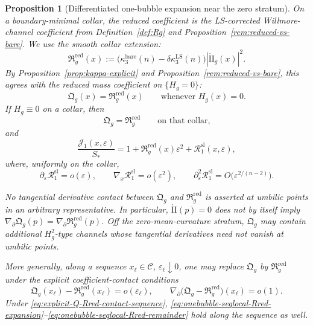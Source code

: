 \documentclass[11pt,reqno,a4paper]{amsart}
\numberwithin{equation}{section}
\theoremstyle{plain}
\newtheorem{proposition}[theorem]{Proposition}
\theoremstyle{remark}
\theoremstyle{plain}
\begin{document}
\begin{proposition}[Differentiated one-bubble expansion near the zero stratum]
On a boundary-minimal collar, the reduced coefficient is the LS-corrected Willmore-channel coefficient
from Definition~\ref{def:Rg} and Proposition~\ref{rem:reduced-vs-bare}.  We use the smooth collar
extension:
\begin{equation}\label{eq:Rred-Willmore-channel-extension}
\mathfrak R_g^{\mathrm{red}}(x)
:=
\bigl(\kappa_3^{\mathrm{bare}}(n)-\delta\kappa_3^{\mathrm{LS}}(n)\bigr)
|\mathring{\mathrm{II}}_g(x)|^2 .
\end{equation}
By Proposition~\ref{prop:kappa-explicit} and Proposition~\ref{rem:reduced-vs-bare}, this agrees with
the reduced mass coefficient on $\{H_g=0\}$:
\begin{equation}\label{eq:Q-equals-Rred-zero-stratum}
\mathfrak Q_g(x)=\mathfrak R_g^{\mathrm{red}}(x)
\qquad\text{whenever }H_g(x)=0.
\end{equation}
If $H_g\equiv0$ on a collar, then
\begin{equation}\label{eq:Q-equals-Rred-minimal-collar}
\mathfrak Q_g=\mathfrak R_g^{\mathrm{red}}
\qquad\text{on that collar,}
\end{equation}
and
\begin{equation}\label{eq:onebubble-seqlocal-Rred-expansion}
\frac{\mathcal J_1(x,\varepsilon)}{S_\ast}
=
1+\mathfrak R_g^{\mathrm{red}}(x)\varepsilon^2
+\mathcal R_1^{\mathrm{sl}}(x,\varepsilon),
\end{equation}
where, uniformly on the collar,
\begin{equation}\label{eq:onebubble-seqlocal-Rred-remainder}
\partial_\varepsilon\mathcal R_1^{\mathrm{sl}}=o(\varepsilon),
\qquad
\nabla_x\mathcal R_1^{\mathrm{sl}}=o(\varepsilon^2),
\qquad
\partial_\varepsilon^2\mathcal R_1^{\mathrm{sl}}
=O\bigl(\varepsilon^{2/(n-2)}\bigr).
\end{equation}

No tangential derivative contact between $\mathfrak Q_g$ and
$\mathfrak R_g^{\mathrm{red}}$ is asserted at umbilic points in an arbitrary
representative.  In particular, $\mathring{\mathrm{II}}(p)=0$ does not by
itself imply $\nabla_\partial\mathfrak Q_g(p)=\nabla_\partial\mathfrak R_g^{\mathrm{red}}(p)$.
Off the zero-mean-curvature stratum, $\mathfrak Q_g$ may contain additional
$H_g^2$-type channels whose tangential derivatives need not vanish at umbilic
points.

More generally, along a sequence $x_\ell\in\mathcal C$,
$\varepsilon_\ell\downarrow0$, one may replace $\mathfrak Q_g$ by
$\mathfrak R_g^{\mathrm{red}}$ under the explicit coefficient-contact
conditions
\begin{equation}\label{eq:explicit-Q-Rred-contact-sequence}
\mathfrak Q_g(x_\ell)-\mathfrak R_g^{\mathrm{red}}(x_\ell)
=
o(\varepsilon_\ell),
\qquad
\nabla_\partial\bigl(\mathfrak Q_g-\mathfrak R_g^{\mathrm{red}}\bigr)(x_\ell)
=
o(1).
\end{equation}
Under \eqref{eq:explicit-Q-Rred-contact-sequence},
\eqref{eq:onebubble-seqlocal-Rred-expansion}--\eqref{eq:onebubble-seqlocal-Rred-remainder}
hold along the sequence as well.
\end{proposition}
\end{document}
